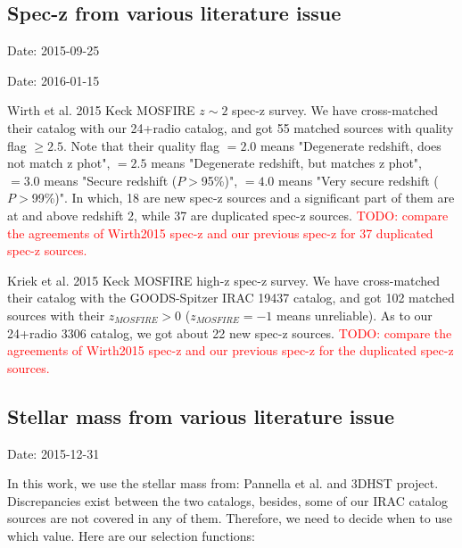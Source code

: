 \documentclass[11pt,a4paper]{article}
\begin{document}

\subsection{Spec-z from various literature issue}

\textcolor{green!90!black!60!orange}{Date: 2015-09-25}

\textcolor{green!90!black!60!orange}{Date: 2016-01-15}

Wirth et al. 2015 Keck MOSFIRE $z\sim2$ spec-z survey. We have cross-matched their catalog with our 24+radio catalog, and got 55 matched sources with quality flag $\ge2.5$. Note that their quality flag $=2.0$ means "Degenerate redshift, does not match z phot", $=2.5$ means "Degenerate redshift, but matches z phot", $=3.0$ means "Secure redshift ($P>$95\%)", $=4.0$ means "Very secure redshift ($P>$99\%)". In which, 18 are new spec-z sources and a significant part of them are at and above redshift 2, while 37 are duplicated spec-z sources. \textcolor{red}{TODO: compare the agreements of Wirth2015 spec-z and our previous spec-z for 37 duplicated spec-z sources.}

Kriek et al. 2015 Keck MOSFIRE high-z spec-z survey. We have cross-matched their catalog with the GOODS-Spitzer IRAC 19437 catalog, and got 102 matched sources with their $z_{MOSFIRE}>0$ ($z_{MOSFIRE}=-1$ means unreliable). As to our 24+radio 3306 catalog, we got about 22 new spec-z sources. \textcolor{red}{TODO: compare the agreements of Wirth2015 spec-z and our previous spec-z for the duplicated spec-z sources.}


\subsection{Stellar mass from various literature issue}

\textcolor{green!90!black!60!orange}{Date: 2015-12-31}

In this work, we use the stellar mass from: Pannella et al. and 3DHST project. Discrepancies exist between the two catalogs, besides, some of our IRAC catalog sources are not covered in any of them. Therefore, we need to decide when to use which value. Here are our selection functions:
\end{document}
